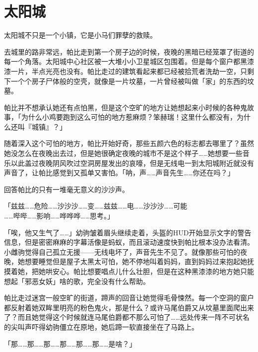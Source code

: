 \chapter{太阳城}


\begin{intro}
太阳城不只是一个小镇，它是小马们罪孽的救赎。
\end{intro}


去城里的路非常远，帕比走到第一个房子边的时候，夜晚的黑暗已经笼罩了街道的每一个角落。太阳城中心社区被一大堆小小卫星城区包围着。但是每个窗户都黑漆漆一片，半点光亮也没有。帕比走过的建筑看起来都已经被拾荒者洗劫一空，只剩下一个个房子尸体般的空壳，就像是一片坟墓，一片曾经被叫做「家」的东西的坟墓。

帕比并不想承认她还有点怕黑，但是这个空旷的地方让她想起来小时候的各种鬼故事，「为什么小鸡要跑到这么可怕的地方惹麻烦？笨赫瑞！这里什么都没有，为什么还叫『城镇』？」

随着深入这个可怕的地方，帕比开始好奇，那些五颜六色的标志都去哪里了？虽然她没怎么在夜晚出去过，但是她很确定夜晚的城市不是这个样子……她想要一些音乐以此盖过夜晚阴风吹过空洞房屋发出的哀嚎，但是无线电一到太阳城附近就没有声音了，让帕比感觉到又孤单又害怕。「呐，声……声音先生……你还在吗？」

回答帕比的只有一堆毫无意义的沙沙声。

「{\mtzh 兹兹……危险……沙沙沙……变……兹兹……电……沙沙沙……可能\\……哔哔……影响……哗哗哗……思考。}」


「唉，他又生气了……」幼驹皱着眉头继续走着，头盔的HUD开始显示文字的警告信息，但是密密麻麻的字幕活像是蚂蚁，而且滚动速度快到帕比根本没办法看清。小雌驹觉得自己孤立无援——无线电坏了，声音先生不见了。就像那些可怕的夜晚，她想要睡觉但是屋子太黑太可怕，她不停地叫着妈妈，直到妈妈过来抱起她抚摸着她，把她哄安心。帕比想要唱点儿什么壮胆，但是在这种黑漆漆的地方她只能想起「邪恶女妖」啥的歌，完全没有什么帮助。

帕比走过迷宫一般空旷的街道，蹄声的回音让她觉得毛骨悚然。每一个空洞的窗户都反射着她双眸里明亮的粉色鬼火，那是什么？或许马尾伯爵又从坟墓里面爬出来了？而且她觉得这个时候就连马尾伯爵都不那么可怕了……远处传来一阵不可状名的尖叫声吓得幼驹僵立在原地，她后蹄一软直接坐在了马路上。

「那……那……那……那……那……那……是啥？」

